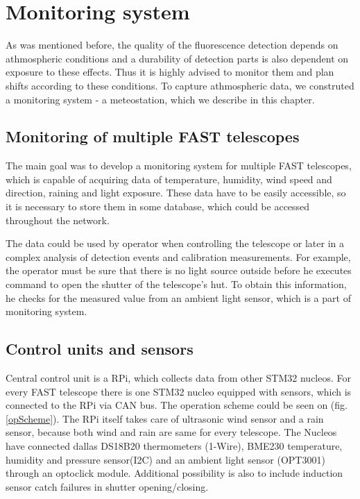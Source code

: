 
\chapter{Monitoring system}
As was mentioned before, the quality of the fluorescence detection depends on athmospheric conditions and a durability of detection parts is also dependent on exposure to these effects. Thus it is highly advised to monitor them and plan shifts according to these conditions. To capture athmospheric data, we construted a monitoring system - a meteostation, which we describe in this chapter.
\section{Monitoring of multiple FAST telescopes}
The main goal was to develop a monitoring system for multiple FAST telescopes, which is capable of acquiring data of temperature, humidity, wind speed and direction, raining and light exposure. These data have to be easily accessible, so it is necessary to store them in some database, which could be accessed throughout the network. 
\par
The data could be used by operator when controlling the telescope or later in a complex analysis of detection events and calibration measurements. For example, the operator must be sure that there is no light source outside before he executes command to open the shutter of the telescope's hut. To obtain this information, he checks for the measured value from an ambient light sensor, which is a part of monitoring system.
\par

\section{Control units and sensors}
Central control unit is a RPi, which collects data from other STM32 nucleos. For every FAST telescope there is one STM32 nucleo equipped with sensors, which is connected to the RPi via CAN bus. The operation scheme could be seen on (fig. \ref{opScheme}). The RPi itself takes care of ultrasonic wind sensor and a rain sensor, because both wind and rain are same for every telescope. The Nucleos have connected dallas DS18B20 thermometers (1-Wire), BME230 temperature, humidity and pressure sensor(I2C) and an ambient light sensor (OPT3001) through an optoclick module. Additional possibility is also to include induction sensor catch failures in shutter opening/closing.


